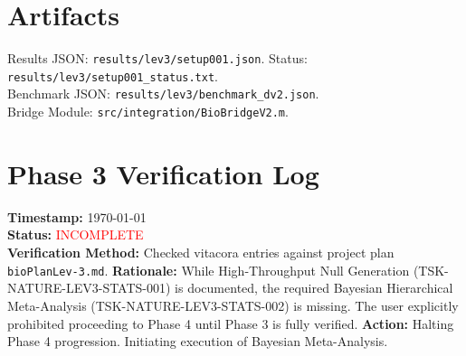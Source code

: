 \documentclass[11pt]{article}
\begin{document}
\begin{table}[h]
\centering
\caption{Selected Results from High-Throughput Validation ($N=231$)}
\label{tab:hpc_results}
\end{table}

\section{Artifacts}
Results JSON: \texttt{results/lev3/setup001.json}. Status: \texttt{results/lev3/setup001\_status.txt}.\\
Benchmark JSON: \texttt{results/lev3/benchmark\_dv2.json}.\\
Bridge Module: \texttt{src/integration/BioBridgeV2.m}.

\section*{Phase 3 Verification Log}
\textbf{Timestamp:} \today \\
\textbf{Status:} \textcolor{red}{INCOMPLETE} \\
\textbf{Verification Method:} Checked vitacora entries against project plan \texttt{bioPlanLev-3.md}.
\textbf{Rationale:} While High-Throughput Null Generation (TSK-NATURE-LEV3-STATS-001) is documented, the required Bayesian Hierarchical Meta-Analysis (TSK-NATURE-LEV3-STATS-002) is missing. The user explicitly prohibited proceeding to Phase 4 until Phase 3 is fully verified.
\textbf{Action:} Halting Phase 4 progression. Initiating execution of Bayesian Meta-Analysis.
\end{document}
